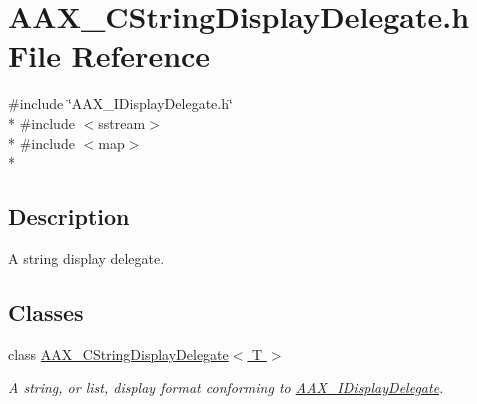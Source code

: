 \hypertarget{a00198}{}\section{A\+A\+X\+\_\+\+C\+String\+Display\+Delegate.\+h File Reference}
\label{a00198}
{\ttfamily \#include \char`\"{}A\+A\+X\+\_\+\+I\+Display\+Delegate.\+h\char`\"{}}\\*
{\ttfamily \#include $<$sstream$>$}\\*
{\ttfamily \#include $<$map$>$}\\*


\subsection{Description}
A string display delegate. 

\subsection*{Classes}
\begin{DoxyCompactItemize}
\item 
class \hyperlink{a00044}{A\+A\+X\+\_\+\+C\+String\+Display\+Delegate$<$ T $>$}
\begin{DoxyCompactList}\small\item\em A string, or list, display format conforming to \hyperlink{a00092}{A\+A\+X\+\_\+\+I\+Display\+Delegate}. \end{DoxyCompactList}\end{DoxyCompactItemize}
